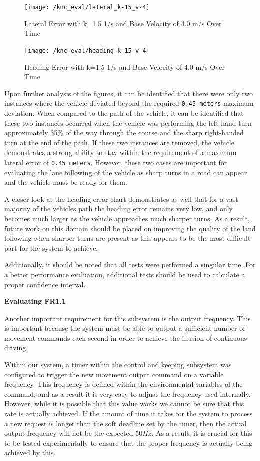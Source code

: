 \documentclass[titlepage,draft]{article}
\begin{document}
{\begin{figure}
	\centering
	\texttt{[image: /knc\_eval/lateral\_k-15\_v-4]}
	\caption{Lateral Error with k=1.5 1/s and Base Velocity of 4.0 m/s Over Time}
	\label{fig:lateralk10v4}
\end{figure}

\begin{figure}
	\centering
	\texttt{[image: /knc\_eval/heading\_k-15\_v-4]}
	\caption{Heading Error with k=1.5 1/s and Base Velocity of 4.0 m/s Over Time}
	\label{fig:headingk10v4}
\end{figure}

Upon further analysis of the figures, it can be identified that there were only two instances where the vehicle deviated beyond the required \texttt{0.45 meters} maximum deviation. When compared to the path of the vehicle, it can be identified that these two instances occurred when the vehicle was performing the left-hand turn approximately 35\% of the way through the course and the sharp right-handed turn at the end of the path. If these two instances are removed, the vehicle demonstrates a strong ability to stay within the requirement of a maximum lateral error of \texttt{0.45 meters}. However, these two cases are important for evaluating the lane following of the vehicle as sharp turns in a road can appear and the vehicle must be ready for them.

A closer look at the heading error chart demonstrates as well that for a vast majority of the vehicles path the heading error remains very low, and only becomes much larger as the vehicle approaches much sharper turns. As a result, future work on this domain should be placed on improving the quality of the land following when sharper turns are present as this appears to be the most difficult part for the system to achieve.

Additionally, it should be noted that all tests were performed a singular time. For a better performance evaluation, additional tests should be used to calculate a proper confidence interval.

\textbf{Evaluating FR1.1}

Another important requirement for this subsystem is the output frequency. This is important because the system must be able to output a sufficient number of movement commands each second in order to achieve the illusion of continuous driving.

Within our system, a timer within the control and keeping subsystem was configured to trigger the new movement output command on a variable frequency. This frequency is defined within the environmental variables of the command, and as a result it is very easy to adjust the frequency used internally. However, while it is possible that this value works we cannot be sure that this rate is actually achieved. If the amount of time it takes for the system to process a new request is longer than the soft deadline set by the timer, then the actual output frequency will not be the expected \(50Hz\). As a result, it is crucial for this to be tested experimentally to ensure that the proper frequency is actually being achieved by this.

}
\end{document}
